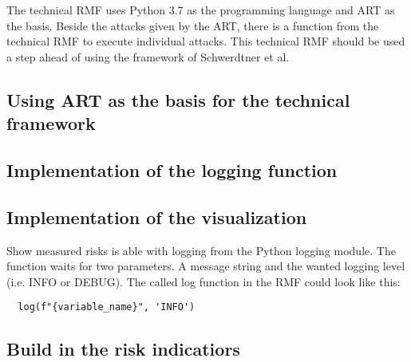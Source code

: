 The technical RMF uses Python 3.7 as the programming language and ART as the basis. Beside the attacks given by the ART, there is a function from the technical RMF to execute individual attacks. This technical RMF should be used a step ahead of using the framework of Schwerdtner et al.

\subsection{Using ART as the basis for the technical framework}

\subsection{Implementation of the logging function}

\subsection{Implementation of the visualization}

Show measured risks is able with logging from the Python logging module. The function waits for two parameters. A message string and the wanted logging level (i.e. INFO or DEBUG). The called log function in the RMF could look like this:
\begin{lstlisting}
  log(f"{variable_name}", 'INFO')
\end{lstlisting}

\subsection{Build in the risk indicatiors}
